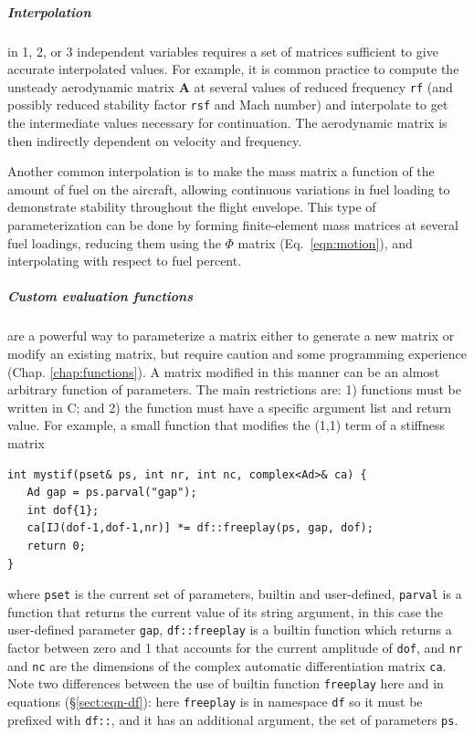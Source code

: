 \documentclass[11pt,openany,twoside]{book}
\numberwithin{equation}{section}		%
\def\Cpp{{C\nolinebreak[4]\hspace{-.05em}\raisebox{.4ex}{\tiny\bf ++}}\:}
\newcommand{\Code}[1]{{\small\tt #1}}
\newcommand{\Matrix}[1]{\boldsymbol{#1}}
\newcommand{\Sectref}[1]{\S\ref{#1}}
\newcommand{\Chapref}[1]{Chap. \ref{#1}}
\newcommand{\Eqn}[1]{Eq.\ \ref{#1}}  %
\begin{document}
\subparagraph{Interpolation} in 1, 2, or 3 independent variables
requires a set of matrices sufficient to give accurate interpolated
values.
For example, it is common practice to compute
the unsteady aerodynamic matrix $\Matrix{A}$ at several values of
reduced frequency \Code{rf} (and possibly reduced stability factor
\Code{rsf} and Mach number) and interpolate to get the
intermediate values necessary for continuation. The aerodynamic matrix is
then indirectly dependent on velocity and frequency.

Another common interpolation is to make the mass matrix a function
of the amount of fuel on the aircraft, allowing continuous variations
in fuel loading to demonstrate stability throughout the flight envelope.
This type of parameterization can be done by forming finite-element
mass matrices at several fuel loadings, reducing them using the
$\Phi$ matrix (\Eqn{eqn:motion}), and interpolating with respect to
\index{=Phi@$\Matrix{\Phi}$!parameterizing with}
fuel percent.

\subparagraph{Custom evaluation functions} are a
powerful way to parameterize a matrix either to generate a new matrix
or modify an existing matrix,
but require caution and some programming experience (\Chapref{chap:functions}).
A matrix modified in this manner can be an almost arbitrary function
of parameters. The main restrictions are: 1) functions must be written in \Cpp;
and 2) the function must have a specific argument list and return value.
For example, a small function that modifies the (1,1) term of a stiffness matrix
\begin{lstlisting}
int mystif(pset& ps, int nr, int nc, complex<Ad>& ca) {
   Ad gap = ps.parval("gap");
   int dof{1};
   ca[IJ(dof-1,dof-1,nr)] *= df::freeplay(ps, gap, dof);
   return 0;
}
\end{lstlisting}
where \Code{pset} is the current set of parameters, builtin and user-defined,
\Code{parval} is a function that returns the current value of its
string argument, in this case the user-defined parameter \Code{gap},
\Code{df::freeplay} is a builtin function which returns a factor between
zero and 1 that accounts for the current amplitude of \Code{dof},
and \Code{nr} and \Code{nc} are the dimensions of the complex
automatic differentiation matrix \Code{ca}.
Note two differences between the use of builtin function \Code{freeplay}
here and in equations (\Sectref{sect:eqn-df}): here \Code{freeplay} is
in namespace \Code{df} so it must be prefixed with \Code{df::}, and
it has an additional argument, the set of parameters \Code{ps}.
\end{document}

